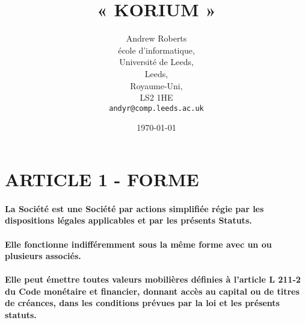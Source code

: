 \documentclass[a4paper, 11pt]{article}
\begin{document}
\title{« KORIUM »}
\author{Andrew Roberts\\
   école d'informatique,\\
   Université de Leeds,\\
   Leeds,\\
   Royaume-Uni,\\
   LS2 1HE\\
   \texttt{andyr@comp.leeds.ac.uk}}
\date{\today}

\maketitle

\section*{ARTICLE 1 - FORME}

\paragraph{La Société est une Société par actions simplifiée régie par les dispositions légales applicables et par les présents Statuts.}

\paragraph{Elle fonctionne indifféremment sous la même forme avec un ou plusieurs associés.}

\paragraph{Elle peut émettre toutes valeurs mobilières définies à l'article L 211-2 du Code monétaire et financier, donnant accès au capital ou de titres de créances, dans les conditions prévues par la loi et les présents statuts.}
\end{document}
